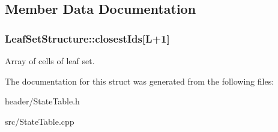 \subsection{Member Data Documentation}
\hypertarget{structLeafSetStructure_a49f823acade4ece2dbdf409995cc8c9e}{
\subsubsection[{closest\-Ids}]{ Leaf\-Set\-Structure\-::closest\-Ids\mbox{[}L+1\mbox{]}}}\label{structLeafSetStructure_a49f823acade4ece2dbdf409995cc8c9e}
Array of cells of leaf set. 

The documentation for this struct was generated from the following files\-:\begin{DoxyCompactItemize}
\item 
header/State\-Table.\-h\item 
src/State\-Table.\-cpp\end{DoxyCompactItemize}
